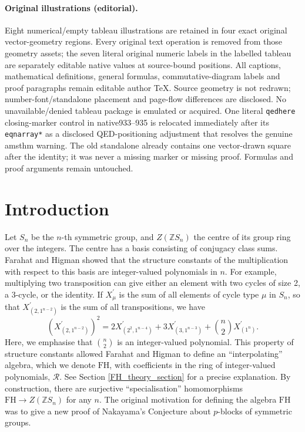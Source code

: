 \documentclass[10pt]{article}
\theoremstyle{definition}
\newcommand{\FH}{\mathrm{FH}}
\begin{document}
\paragraph{Original illustrations (editorial).} Eight numerical/empty tableau illustrations are retained in four exact original vector-geometry regions. Every original text operation is removed from those geometry assets; the seven literal original numeric labels in the labelled tableau are separately editable native values at source-bound positions. All captions, mathematical definitions, general formulas, commutative-diagram labels and proof paragraphs remain editable author TeX. Source geometry is not redrawn; number-font/standalone placement and page-flow differences are disclosed. No unavailable/denied tableau package is emulated or acquired. One literal \texttt{qedhere} closing-marker control in native933--935 is relocated immediately after its \texttt{eqnarray*} as a disclosed QED-positioning adjustment that resolves the genuine amsthm warning. The old standalone already contains one vector-drawn square after the identity; it was never a missing marker or missing proof. Formulas and proof arguments remain untouched.
\clearpage
\section{Introduction}
Let $S_n$ be the $n$-th symmetric group, and $Z(\mathbb{Z}S_n)$ the centre of its group ring over the integers. The centre has a basis consisting of conjugacy class sums. Farahat and Higman \cite{FarahatHigman} showed that the structure constants of the multiplication with respect to this basis are integer-valued polynomials in $n$. For example, multiplying two transposition can give either an element with two cycles of size 2, a 3-cycle, or the identity. If $X_\mu^\prime$ is the sum of all elements of cycle type $\mu$ in $S_n$, so that $X_{(2,1^{n-2})}^\prime$ is the sum of all transpositions, we have
\begin{equation}
(X_{(2,1^{n-2})}^\prime)^2 = 2X_{(2^2,1^{n-4})}^\prime + 3X_{(3,1^{n-3})}^\prime + \binom{n}{2}X_{(1^{n})}^\prime.
\end{equation}
Here, we emphasise that $\binom{n}{2}$ is an integer-valued polynomial. This property of structure constants allowed Farahat and Higman to define an ``interpolating'' algebra, which we denote $\FH$, with coefficients in the ring of integer-valued polynomials, $\mathcal{R}$. See Section \ref{FH_theory_section} for a precise explanation. By construction, there are surjective ``specialisation'' homomorphisms $\FH \to Z(\mathbb{Z}S_n)$ for any $n$. The original motivation for defining the algebra $\FH$ was to give a new proof of Nakayama's Conjecture about $p$-blocks of symmetric groups.
\end{document}
